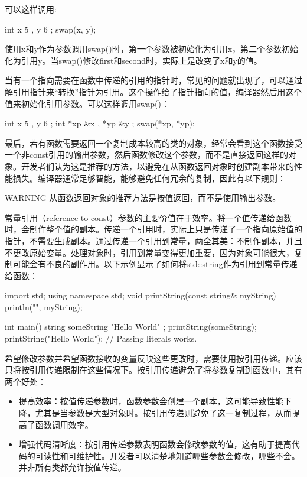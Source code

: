 可以这样调用:

\begin{cpp}
int x { 5 }, y { 6 };
swap(x, y);
\end{cpp}

使用x和y作为参数调用swap()时，第一个参数被初始化为引用x，第二个参数初始化为引用y。当swap()修改first和second时，实际上是改变了x和y的值。

当有一个指向需要在函数中传递的引用的指针时，常见的问题就出现了，可以通过解引用指针来“转换”指针为引用。这个操作给了指针指向的值，编译器然后用这个值来初始化引用参数。可以这样调用swap()：

\begin{cpp}
int x { 5 }, y { 6 };
int *xp { &x }, *yp { &y };
swap(*xp, *yp);
\end{cpp}

最后，若有函数需要返回一个复制成本较高的类的对象，经常会看到这个函数接受一个非const引用的输出参数，然后函数修改这个参数，而不是直接返回这样的对象。开发者们认为这是推荐的方法，以避免在从函数返回对象时创建副本带来的性能损失。编译器通常足够智能，能够避免任何冗余的复制，因此有以下规则：

\begin{myWarning}{WARNING}
从函数返回对象的推荐方法是按值返回，而不是使用输出参数。
\end{myWarning}


常量引用（reference-to-const）参数的主要价值在于效率。将一个值传递给函数时，会制作整个值的副本。传递一个引用时，实际上只是传递了一个指向原始值的指针，不需要生成副本。通过传递一个引用到常量，两全其美：不制作副本，并且不更改原始变量。处理对象时，引用到常量变得更加重要，因为对象可能很大，复制可能会有不良的副作用。以下示例显示了如何将std::string作为引用到常量传递给函数：

\begin{cpp}
import std;
using namespace std;
void printString(const string& myString) { println("{}", myString); }

int main()
{
    string someString { "Hello World" };
    printString(someString);
    printString("Hello World"); // Passing literals works.
}
\end{cpp}


希望修改参数并希望函数接收的变量反映这些更改时，需要使用按引用传递。应该只将按引用传递限制在这些情况下。按引用传递避免了将参数复制到函数中，其有两个好处：

\begin{itemize}
\item
提高效率：按值传递参数时，函数参数会创建一个副本，这可能导致性能下降，尤其是当参数是大型对象时。按引用传递则避免了这一复制过程，从而提高了函数调用效率。

\item
增强代码清晰度：按引用传递参数表明函数会修改参数的值，这有助于提高代码的可读性和可维护性。开发者可以清楚地知道哪些参数会修改，哪些不会。并非所有类都允许按值传递。
\end{itemize}

